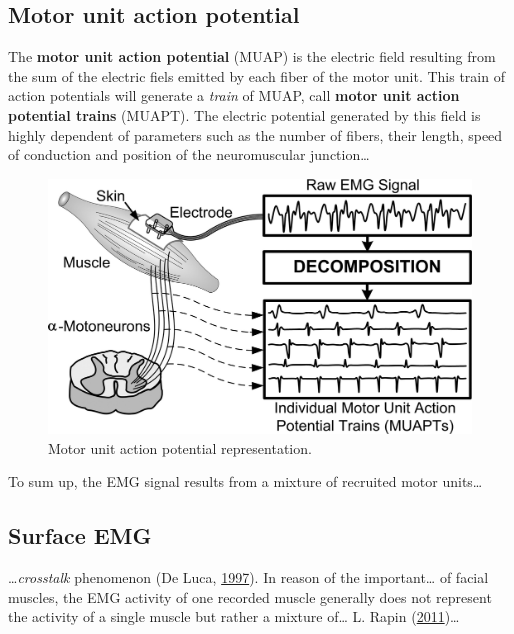 \documentclass[a4paper,12pt,twoside,openright,oldfontcommands]{memoir}
\begin{document}
\subsection{Motor unit action
potential}\label{motor-unit-action-potential}

The \textbf{motor unit action potential} (MUAP) is the electric field
resulting from the sum of the electric fiels emitted by each fiber of
the motor unit. This train of action potentials will generate a
\emph{train} of MUAP, call \textbf{motor unit action potential trains}
(MUAPT). The electric potential generated by this field is highly
dependent of parameters such as the number of fibers, their length,
speed of conduction and position of the neuromuscular junction\ldots{}

\begin{figure}[H]

{\centering \includegraphics[width=1\linewidth]{assets/muap} 

}

\caption{Motor unit action potential representation.}\label{fig:unnamed-chunk-1}
\end{figure}

To sum up, the EMG signal results from a mixture of recruited motor
units\ldots{}

\subsection{Surface EMG}\label{surface-emg}

\ldots{}\emph{crosstalk} phenomenon (De Luca,
\protect\hyperlink{ref-de_luca_use_1997}{1997}). In reason of the
important\ldots{} of facial muscles, the EMG activity of one recorded
muscle generally does not represent the activity of a single muscle but
rather a mixture of\ldots{} L. Rapin
(\protect\hyperlink{ref-Rapin2011}{2011})\ldots{}
\end{document}
